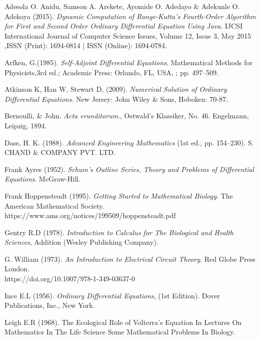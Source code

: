 \documentclass[11pt]{report}
\begin{document}
	\begin{description}
		\item Adesola O. Anidu, Samson A. Arekete, Ayomide O. Adedayo \& Adekunle O. Adekoya (2015). \emph{Dynamic Computation of Runge-Kutta’s Fourth-Order Algorithm for
		First and Second Order Ordinary Differential Equation Using Java}. IJCSI International Journal of Computer Science Issues, Volume 12, Issue 3, May 2015 ,ISSN (Print): 1694-0814 | ISSN (Online): 1694-0784.
		
		\item Arfken, G.(1985). \emph{Self-Adjoint Differential Equations}. Mathematical Methods for Physicists,3rd ed.; Academic Press: Orlando, FL, USA, ; pp. 497–509.
		
		\item Atkinson K, Han W, Stewart D, (2009). \emph{Numerical Solution of Ordinary Differential Equations}. New Jersey: John Wiley \& Sons, Hoboken: 70-87.
		
		\item Bernoulli, \& John. \emph{Acta erunditorum}., Ostwald's Klassiker, No. 46. Engelmann,
		Leipzig, 1894.
		
		\item Dass, H. K. (1988). \emph{Advanced Engineering Mathematics} (1st ed., pp. 154–230). S. CHAND \& COMPANY PVT. LTD.
		
		\item Frank Ayres (1952). \emph{Schum's Outline Series, Theory and Problems of Differential Equations}. McGraw-Hill.
		
		\item Frank Hoppensteadt (1995). \emph{Getting Started to Mathematical Biology}. The American Mathematical Society. \\ https://www.ams.org/notices/199509/hoppensteadt.pdf
		
		\item Gentry R.D (1978). \emph{Introduction to Calculus for The Biological and Health Sciences}, Addition (Wesley Publishing Company).
		
		\item G. William (1973). \emph{An Introduction to Electrical Circuit Theory}. Red Globe Press London.
		\\https://doi.org/10.1007/978-1-349-03637-0
		
		\item Ince E.L (1956). \emph{Ordinary Differential Equations}, (1st Edition). Dover Publications, Inc., New York.
		
		\item Leigh E.R (1968). The Ecological Role of Volterra’s Equation In Lectures On Mathematics In The Life Science Some Mathematical Problems In Biology.
		

\end{description}
\end{document}
